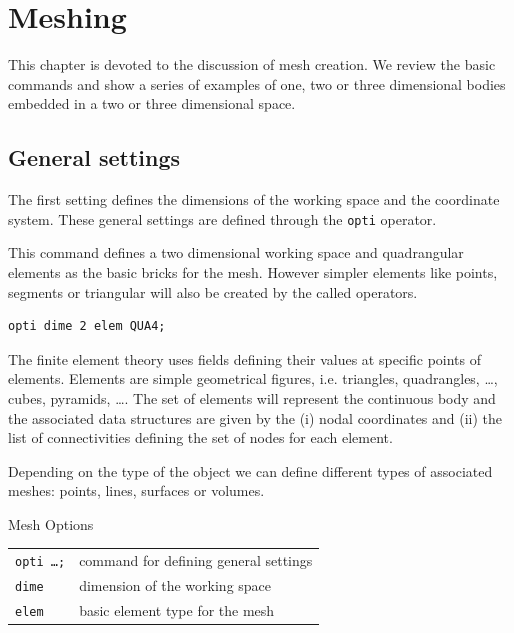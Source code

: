 \chapter{Meshing}
\label{chap:meshing}

This chapter is devoted to the discussion of mesh creation. We review the basic commands 
and show a series of examples of one, two or three dimensional bodies embedded 
in a two or three dimensional space. 

\section{General settings}

The first setting defines the dimensions of the working space and 
the coordinate system.
These general settings are defined through the \texttt{opti} operator.  

\begin{castemcom}
This command defines a two dimensional working space 
and quadrangular elements as the basic bricks for the 
mesh. However simpler elements like points, segments or 
triangular will also be created by the called operators.    
\end{castemcom}
\begin{castemlines}
\begin{verbatim}
opti dime 2 elem QUA4; 
\end{verbatim}
\end{castemlines}

\FloatBarrier

The finite element theory uses fields defining their values 
at specific points of elements. Elements are simple geometrical figures, i.e. 
triangles, quadrangles, \ldots, cubes, pyramids, \ldots. The set of elements 
will represent the continuous body and the associated data structures 
are given by the (i) nodal coordinates and (ii) the list of connectivities 
defining the set of nodes for each element.

Depending on the type of the object we can define different types of associated 
meshes: points, lines, surfaces or volumes. 

\begin{gbox}{Mesh Options}
\begin{tabular}{ll}
\texttt{opti \ldots;} & command for defining general settings \\
\texttt{dime} & dimension of the working space \\
\texttt{elem} & basic element type for the mesh \\
\end{tabular}
\end{gbox}

